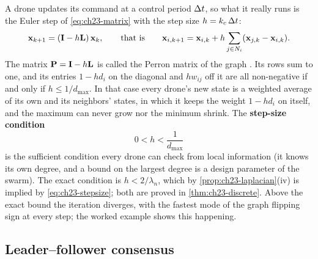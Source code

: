 A drone updates its command at a control period $\Delta t$, so what it really runs
is the Euler step of \cref{eq:ch23-matrix} with the step size
$h = k_c\,\Delta t$:
\begin{equation}
  \mathbf{x}_{k+1} = (\mathbf{I} - h\mathbf{L})\,\mathbf{x}_k, \qquad\text{that is}\qquad
  \mathbf{x}_{i,k+1} = \mathbf{x}_{i,k} + h \sum_{j \in N_i} (\mathbf{x}_{j,k} - \mathbf{x}_{i,k}).
  \label{eq:ch23-discrete}
\end{equation}
The matrix $\mathbf{P} = \mathbf{I} - h\mathbf{L}$ is called the Perron matrix of
the graph \cite{olfatisaber2007consensus}. Its rows sum to one, and its entries
$1 - h d_i$ on the diagonal and $h w_{ij}$ off it are all non-negative if
and only if $h \le 1/d_{\max}$. In that case every drone's new state is a
weighted average of its own and its neighbors' states, in which it keeps the
weight $1 - h d_i$ on itself, and the maximum can never grow nor the minimum
shrink. The \textbf{step-size condition}
\begin{equation}
  0 < h < \frac{1}{d_{\max}}
  \label{eq:ch23-stepsize}
\end{equation}
is the sufficient condition every drone can check from local information (it
knows its own degree, and a bound on the largest degree is a design parameter
of the swarm). The exact condition is $h < 2/\lambda_n$, which by
\cref{prop:ch23-laplacian}(iv) is implied by \cref{eq:ch23-stepsize}; both are
proved in \cref{thm:ch23-discrete}. Above the exact bound the iteration
diverges, with the fastest mode of the graph flipping sign at every step; the
worked example shows this happening.

\subsection{Leader--follower consensus}
\label{sec:ch23-leader}

